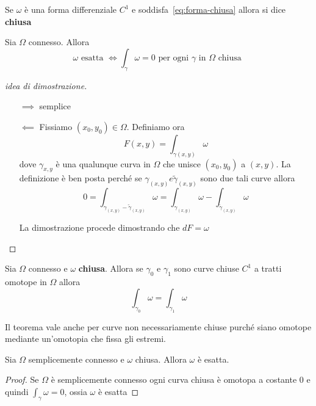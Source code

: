 \begin{definition}
    Se \(\omega\) è una forma differenziale \(C^{1}\) e
    soddisfa~\eqref{eq:forma-chiusa} allora si dice \textbf{chiusa} 
\end{definition}
\begin{theorem}\label{thm:1_forme}
    Sia \(\Omega\) connesso. Allora 
    \[
        \omega \text{ esatta } \iff \int_{\gamma} \omega = 0 \text{ per ogni
        \(\gamma\) in \(\Omega\) chiusa }
    \]
\end{theorem}
\begin{proof}[idea di dimostrazione]\( \)
\begin{itemize}
    \item[\(\implies \)] semplice
    \item[\(\impliedby \)] Fissiamo \((x_{0},y_{0}) \in \Omega\). Definiamo ora 
        \[
            F(x, y) = \int_{\gamma(x,y)} \omega
        \]
        dove \(\gamma_{x,y} \) è una qualunque curva in \(\Omega\) che unisce
        \((x_{0},y_{0})\) a \((x,y)\). La definizione è ben posta perché se
        \(\gamma_{(x,y)} e \tilde{\gamma}_{(x,y)}\) sono due tali curve allora
        \[
            0 = \int_{\gamma_{(x,y)} - \tilde{\gamma}_{(x,y)}} \omega =
            \int_{\gamma_{(x,y)}} \omega - \int_{\tilde{\gamma}_{(x,y)}} \omega
        \]

        La dimostrazione procede dimostrando che \(dF = \omega\)
\end{itemize}
\end{proof}

\begin{theorem}\label{thm:2_forme}
    Sia \(\Omega\) connesso e \(\omega\) \textbf{chiusa}. Allora se
    \(\gamma_{0}\) e \(\gamma_{1}\) sono curve chiuse \(C^{1}\) a tratti omotope
    in \(\Omega\) allora
    \[
        \int_{\gamma_{0}} \omega = \int_{\gamma_{1}} \omega
    \]
\end{theorem}
\begin{remark}
    Il teorema vale anche per curve non necessariamente chiuse purché siano omotope 
    mediante un'omotopia che fissa gli estremi.
\end{remark}

\begin{corollary}
    Sia \(\Omega\) semplicemente connesso e \(\omega\) chiusa. Allora \(\omega\)
    è esatta.
\end{corollary}
\begin{proof}
    Se \(\Omega\) è semplicemente connesso ogni curva chiusa è omotopa a
    costante \(0\) e quindi \(\int_{\gamma} \omega = 0\), ossia \(\omega\) è
    esatta 
\end{proof}


